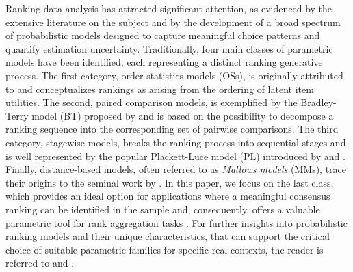 {
Ranking data analysis has attracted significant attention, as evidenced by the extensive literature on the subject \citep[see][for fundamental reviews]{critchlow91probability, Marden1995} and by the development of a broad spectrum of probabilistic models designed to capture meaningful choice patterns and quantify estimation uncertainty.
Traditionally, four main classes of parametric models have been identified, each representing a distinct ranking generative process. The first category, order statistics models (OSs), is originally attributed to \cite{thurstone27law} and conceptualizes rankings as arising from the ordering of latent item utilities. The second, paired comparison models, is exemplified by the Bradley-Terry model (BT) proposed by \citet{bradley1952rank} and is based on the possibility to decompose a ranking sequence into the corresponding set of pairwise comparisons. The third category, stagewise models, breaks the ranking process into sequential stages and is well represented by the popular Plackett-Luce model (PL) introduced by \cite{Luce1959} and \cite{Plackett1975}. Finally, distance-based models, often referred to as \textit{Mallows models} (MMs), trace their origins to the seminal work by \citet{Mallows1957}. 
In this paper, we focus on the last class, 
which provides an ideal option for applications where a meaningful consensus ranking can be identified in the sample and, consequently, offers a valuable parametric tool for rank aggregation tasks \citep{Marden1995}. For further insights into probabilistic ranking models and their unique characteristics, that can support the critical choice of suitable parametric families for specific real contexts, the reader is referred to \citet{Liu2019} and \citet{AlvoYu2014}.}

